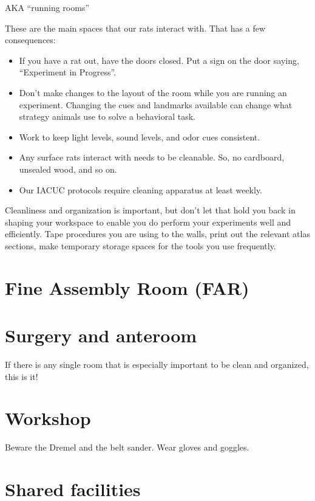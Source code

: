\documentclass{tufte-book}
\begin{document}
AKA ``running rooms''

These are the main spaces that our rats interact with. That has a few
consequences:

\begin{itemize}
\item{If you have a rat out, have the doors closed. Put a sign on the
  door saying, ``Experiment in Progress''.}
\item{Don't make changes to the layout of the room while you are
  running an experiment. Changing the cues and landmarks available can
  change what strategy animals use to solve a behavioral task.}
\item{Work to keep light levels, sound levels, and odor cues
  consistent.}
\item{Any surface rats interact with needs to be cleanable. So, no
  cardboard, unsealed wood, and so on.}
\item{Our IACUC protocols require cleaning apparatus at least weekly.}
\end{itemize}

Cleanliness and organization is important, but don't let that hold you
back in shaping your workspace to enable you do perform your
experiments well and efficiently. Tape procedures you are using to the
walls, print out the relevant atlas sections, make temporary storage
spaces for the tools you use frequently.

\section{Fine Assembly Room (FAR)}

\section{Surgery and anteroom}

If there is any single room that is especially important to be clean
and organized, this is it!

\section{Workshop}

Beware the Dremel and the belt sander. Wear gloves and goggles.

\section{Shared facilities}
\end{document}
